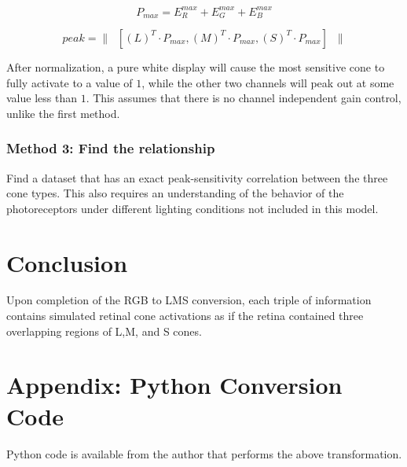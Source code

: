 \documentclass[12pt]{article}
\begin{document}
\begin{equation}
P_{max} = E_R^{max} + E_G^{max} + E_B^{max}
\label{eqn:purewhite}
\end{equation}

\begin{equation}
peak = \| \;\; [ (L)^T \cdot P_{max}, 
	(M)^T \cdot P_{max}, 
	(S)^T \cdot P_{max}] \;\; \|
\label{eqn:normlmspeak}
\end{equation}

After normalization, a pure white display will cause the most
sensitive cone to fully activate to a value of $1$, while the other
two channels will peak out at some value less than $1$.  This assumes
that there is no channel independent gain control, unlike the first
method.


\subsubsection{Method 3: Find the relationship}

Find a dataset that has an exact peak-sensitivity correlation between
the three cone types.  This also requires an understanding of the
behavior of the photoreceptors under different lighting conditions not
included in this model.


\section{Conclusion}

Upon completion of the RGB to LMS conversion, each triple of
information contains simulated retinal cone activations as if the
retina contained three overlapping regions of L,M, and S cones.



\section{Appendix: Python Conversion Code}

Python code is available from the author that performs the above
transformation.

% 




\end{document}

